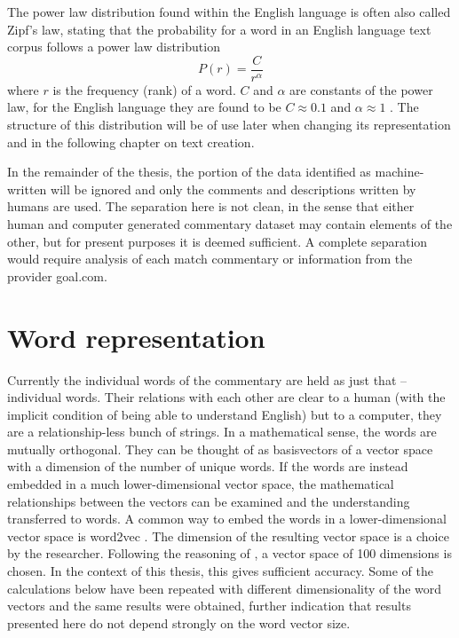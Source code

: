 \documentclass[10pt, a4paper]{UUThesisTemplate}
\begin{document}
The power law distribution found within the English language is often also called Zipf's law, stating that the probability for a word in an English language text corpus follows a power law distribution
\begin{equation}
P(r) = \frac{C}{r^\alpha}
\end{equation}
where $r$ is the frequency (rank) of a word. $C$ and $\alpha$ are constants of the power law, for the English language they are found to be $C\approx 0.1$ and $\alpha \approx 1$ \cite{randomwordspowerlaw}. The structure of this distribution will be of use later when changing its representation and in the following chapter on text creation.


In the remainder of the thesis, the portion of the data identified as machine-written will be ignored and only the comments and descriptions written by humans are used. The separation here is not clean, in the sense that either human and computer generated commentary dataset may contain elements of the other, but for present purposes it is deemed sufficient. A complete separation would require analysis of each match commentary or information from the provider goal.com.

\section{Word representation}\label{sec:wordrep}

Currently the individual words of the commentary are held as just that – individual words. Their relations with each other are clear to a human (with the implicit condition of being able to understand English) but to a computer, they are a relationship-less bunch of strings. In a mathematical sense, the words are mutually orthogonal. They can be thought of as basisvectors of a vector space with a dimension of the number of unique words. If the words are instead embedded in a much lower-dimensional vector space, the mathematical relationships between the vectors can be examined and the understanding transferred to words. A common way to embed the words in a lower-dimensional vector space is word2vec \cite{word2vec}. The dimension of the resulting vector space is a choice by the researcher. Following the reasoning of \cite{GloVe}, a vector space of 100 dimensions is chosen. In the context of this thesis, this gives sufficient accuracy. Some of the calculations below have been repeated with different dimensionality of the word vectors and the same results were obtained, further indication that results presented here do not depend strongly on the word vector size.
\end{document}
